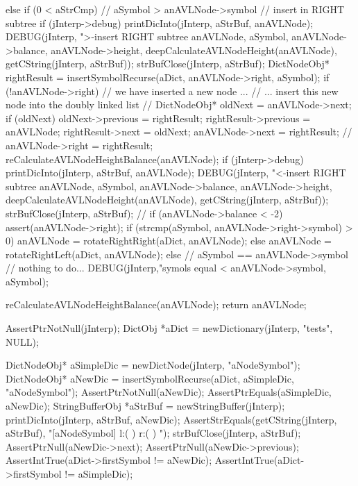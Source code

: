 {{{{      }
    }
  } else if (0 < aStrCmp) {
    // aSymbol > anAVLNode->symbol // insert in RIGHT subtree
    if (jInterp->debug) {
      printDicInto(jInterp, aStrBuf, anAVLNode);
      DEBUG(jInterp, ">-insert RIGHT subtree %
          anAVLNode, aSymbol, anAVLNode->balance,
          anAVLNode->height, deepCalculateAVLNodeHeight(anAVLNode),
          getCString(jInterp, aStrBuf));
      strBufClose(jInterp, aStrBuf);
    }
    DictNodeObj* rightResult =
      insertSymbolRecurse(aDict, anAVLNode->right, aSymbol);
    if (!anAVLNode->right) {
      // we have inserted a new node ...
      // ... insert this new node into the doubly linked list
      //
      DictNodeObj* oldNext           = anAVLNode->next;
      if (oldNext) oldNext->previous = rightResult;
      rightResult->previous          = anAVLNode;
      rightResult->next              = oldNext;
      anAVLNode->next                = rightResult;
      //
    }
    anAVLNode->right = rightResult;
    reCalculateAVLNodeHeightBalance(anAVLNode);
    if (jInterp->debug) {
      printDicInto(jInterp, aStrBuf, anAVLNode);
      DEBUG(jInterp, "<-insert RIGHT subtree %
          anAVLNode, aSymbol, anAVLNode->balance,
          anAVLNode->height, deepCalculateAVLNodeHeight(anAVLNode),
          getCString(jInterp, aStrBuf));
      strBufClose(jInterp, aStrBuf);
    }
    //
    if (anAVLNode->balance < -2) {
      assert(anAVLNode->right);
      if (strcmp(aSymbol, anAVLNode->right->symbol) > 0) {
        anAVLNode = rotateRightRight(aDict, anAVLNode);
      } else {
        anAVLNode = rotateRightLeft(aDict, anAVLNode);
      }
    }
  } else {
    // aSymbol == anAVLNode->symbol // nothing to do...
    DEBUG(jInterp,"symols equal <%
          anAVLNode->symbol, aSymbol);
  }

  reCalculateAVLNodeHeightBalance(anAVLNode);
  return anAVLNode;
}
\stopCCode

\startCTest
  AssertPtrNotNull(jInterp);
  DictObj *aDict = newDictionary(jInterp, "tests", NULL);
  
  DictNodeObj* aSimpleDic = newDictNode(jInterp, "aNodeSymbol");
  DictNodeObj* aNewDic = insertSymbolRecurse(aDict, aSimpleDic, "aNodeSymbol");
  AssertPtrNotNull(aNewDic);
  AssertPtrEquals(aSimpleDic, aNewDic);
  StringBufferObj *aStrBuf = newStringBuffer(jInterp);
  printDicInto(jInterp, aStrBuf, aNewDic);
  AssertStrEquals(getCString(jInterp, aStrBuf),
  "[aNodeSymbol] l:(  ) r:(  ) ");
  strBufClose(jInterp, aStrBuf);
  AssertPtrNull(aNewDic->next);
  AssertPtrNull(aNewDic->previous);
  AssertIntTrue(aDict->firstSymbol != aNewDic);
  AssertIntTrue(aDict->firstSymbol != aSimpleDic);
\stopCTest
\stopTestCase

